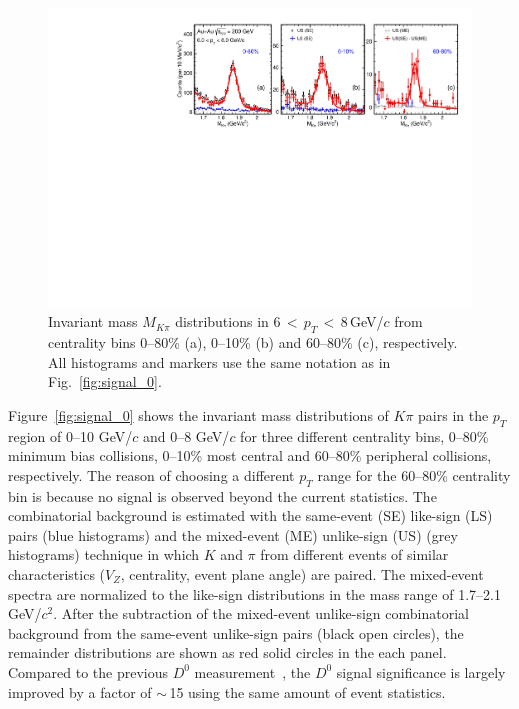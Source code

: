 \documentclass[%
 reprint,	
 amsmath,amssymb,
 aps,
 prc,
]{revtex4-1}
\begin{document}
\begin{figure}
\centering
\includegraphics[width=1.0\textwidth]{fig/signal_6_8GeV.pdf}
\caption{Invariant mass $M_{K\pi}$ distributions in 6\,$<$\,$p_{T}$\,$<$\,8\,GeV/$c$ from centrality bins 0--80\% (a), 0--10\% (b) and 60--80\% (c), respectively. All histograms and markers use the same notation as in Fig.~\ref{fig:signal_0}.}
\label{fig:signal_2} 
\end{figure}

Figure~\ref{fig:signal_0} shows the invariant mass distributions of $K\pi$ pairs in the $p_{T}$ region of 0--10 GeV/$c$ and 0--8 GeV/$c$ for three different centrality bins, 0--80\% minimum bias collisions, 0--10\% most central and 60--80\% peripheral collisions, respectively. The reason of choosing a different $p_T$ range for the 60--80\% centrality bin is because no signal is observed beyond the current statistics. The combinatorial background is estimated with the same-event (SE) like-sign (LS) pairs (blue histograms) and the mixed-event (ME) unlike-sign (US) (grey histograms) technique in which $K$ and $\pi$ from different events of similar characteristics ($V_{Z}$, centrality, event plane angle) are paired. The mixed-event spectra are normalized to the like-sign distributions in the mass range of 1.7--2.1\,GeV/$c^2$. After the subtraction of the mixed-event unlike-sign combinatorial background from the same-event unlike-sign pairs (black open circles), the remainder distributions are shown as red solid circles in the each panel. Compared to the previous $D^0$ measurement~\cite{Star_D_RAA}, the $D^0$ signal significance is largely improved by a factor of $\sim$\,15 using the same amount of event statistics. 
\end{document}
